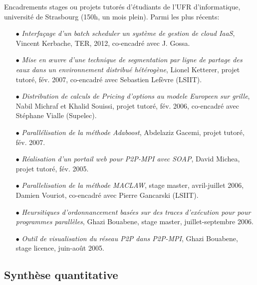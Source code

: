 \documentclass[11pt]{article}
\begin{document}
\label{sc:encadre-autres} 
Encadrements stages ou projets tutorés d'étudiants de l'UFR d'informatique, 
université de Strasbourg (150h, un mois plein). Parmi les plus récents:
\smallskip
\begin{itemize}
\item[$\bullet$]  {\it Interfaçage d'un batch scheduler un système de gestion 
de cloud IaaS}, Vincent Kerbache, TER, 2012, co-encadré avec J. Gossa. 
\item[$\bullet$]  {\it Mise en {\oe}uvre d'une technique de segmentation par 
ligne de partage des eaux dans un environnement distribué hétérogène}, 
Lionel Ketterer, projet tutoré, fév. 2007, co-encadré avec Sebastien 
Lefèvre (LSIIT).
\item[$\bullet$]  {\it Distribution de calculs de Pricing d'options au modele 
Europeen sur grille}, Nabil Michraf et Khalid Souissi, projet tutoré, fév. 2006, 
co-encadré avec Stéphane Vialle (Supelec).

\item[$\bullet$]  {\it Parallélisation de la méthode Adaboost}, Abdelaziz 
Gacemi, projet tutoré, fév. 2007.
\item[$\bullet$] {\it Réalisation d'un portail web pour P2P-MPI avec SOAP}, 
David Michea, projet tutoré, fév. 2005.

\item[$\bullet$] {\it Parallelisation de la méthode MACLAW}, stage master, 
avril-juillet 2006, Damien Vouriot, co-encadré avec Pierre Gancarski (LSIIT).
\item[$\bullet$] {\it Heursitiques d'ordonnancement basées sur des traces 
d'exécution pour pour programmes parallèles}, Ghazi Bouabene, stage master, 
juillet-septembre 2006.
\item[$\bullet$]  {\it Outil de visualisation du réseau P2P dans P2P-MPI}, 
Ghazi Bouabene, stage licence, juin-août 2005.
\end{itemize}





\subsection{Synthèse quantitative}
\end{document}
